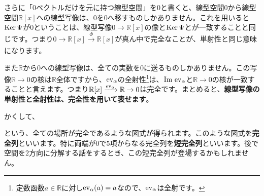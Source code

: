 さらに「$0$ベクトルだけを元に持つ線型空間」を$0$と書くと、線型空間$0$から線型空間$\mathbb{R}[x]$への線型写像は、$0$を$0$へ移すものしかありません。これを用いると$\operatorname{Ker} \Psi$が$0$ということは、線型写像$0\rightarrow\mathbb{R}[x]$の像と$\operatorname{Ker} \Psi$とが一致することと同じです。つまり$0\rightarrow \mathbb{R}[x]\xrightarrow[]{\Phi}\mathbb{R}[x]$が真ん中で完全なことが、単射性と同じ意味になります。

また$\mathbb{R}$から$0$への線型写像は、全ての実数を$0$に送るものしかありません。この写像$\mathbb{R}\rightarrow 0$の核は$\mathbb{R}$全体ですから、$\operatorname{ev}_{\alpha}$の全射性\footnote{定数函数$a \in\mathbb{R}$に対し$\operatorname{ev}_{\alpha}(a) = a$なので、$\operatorname{ev}_{\alpha}$は全射です。}は、$\mathrm{Im}\, \operatorname{ev}_{\alpha}$と$\mathbb{R}\rightarrow 0$の核が一致することと言えます。つまり$\mathbb{R}[x]\xrightarrow[]{\operatorname{ev}_{\alpha}}\mathbb{R}\rightarrow 0$は完全です。まとめると、\textbf{線型写像の単射性と全射性は、完全性を用いて表せます}。

かくして、
\begin{center}
\end{center}
という、全ての場所が完全であるような図式が得られます。このような図式を\textbf{完全列}といいます。特に両端が$0$で$5$項からなる完全列を\textbf{短完全列}といいます。後で空間を$2$方向に分解する話をするとき、この短完全列が登場するかもしれません。


